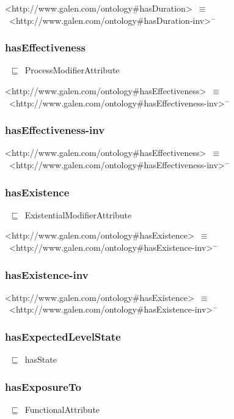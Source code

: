 \documentclass{article}
\begin{document}
<http://www.galen.com/ontology#hasDuration>~\ensuremath{\equiv}~<http://www.galen.com/ontology#hasDuration-inv>\ensuremath{^-}

\subsubsection*{hasEffectiveness}

~\ensuremath{\sqsubseteq}~ProcessModifierAttribute

<http://www.galen.com/ontology#hasEffectiveness>~\ensuremath{\equiv}~<http://www.galen.com/ontology#hasEffectiveness-inv>\ensuremath{^-}

\subsubsection*{hasEffectiveness-inv}

<http://www.galen.com/ontology#hasEffectiveness>~\ensuremath{\equiv}~<http://www.galen.com/ontology#hasEffectiveness-inv>\ensuremath{^-}

\subsubsection*{hasExistence}

~\ensuremath{\sqsubseteq}~ExistentialModifierAttribute

<http://www.galen.com/ontology#hasExistence>~\ensuremath{\equiv}~<http://www.galen.com/ontology#hasExistence-inv>\ensuremath{^-}

\subsubsection*{hasExistence-inv}

<http://www.galen.com/ontology#hasExistence>~\ensuremath{\equiv}~<http://www.galen.com/ontology#hasExistence-inv>\ensuremath{^-}

\subsubsection*{hasExpectedLevelState}

~\ensuremath{\sqsubseteq}~hasState

\subsubsection*{hasExposureTo}

~\ensuremath{\sqsubseteq}~FunctionalAttribute
\end{document}
